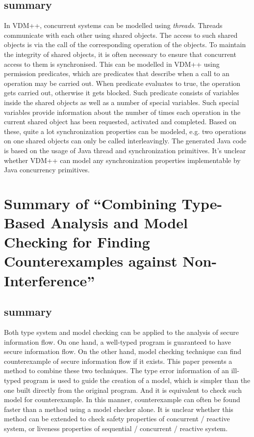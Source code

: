 \documentclass{llncs}
\begin{document}
\subsection{summary}
In VDM++, concurrent systems can be modelled using \emph{threads}. Threads communicate with
each other using shared objects. The access to such shared objects is via 
the call of the corresponding operation of the objects. To maintain the integrity of shared
objects, it is often necessary to ensure that concurrent access to them is synchronised.
This can be modelled in VDM++ using permission predicates, which are predicates that 
describe when a call to an operation may be carried out. When predicate evaluates to true,
the operation gets carried out, otherwise it gets blocked. Such predicate consists of
variables inside the shared objects as well as  a number of special variables. Such special
variables provide information about the number of times each operation in the current
shared object has been requested, activated and completed. Based on these, quite a lot synchronization
properties can be modeled, e.g. two operations on one shared objects can only be called 
interleavingly. The generated Java code is based on the usage of Java thread and synchronization
primitives. It's unclear whether VDM++ can model any synchronization properties implementable by
Java concurrency primitives.
 


\newpage 

\section{Summary of ``Combining Type-Based Analysis and Model Checking for
Finding Counterexamples against Non-Interference''\cite{Unno2006Combining}} 
  \label{section:type_model_interference}

\subsection{summary}
Both type system and model checking can be applied to the analysis of secure information
flow. On one hand, a well-typed program is guaranteed to have secure information flow.
On the other hand, model checking technique can find counterexample of secure information
flow if it exists. This paper presents a method to combine these two techniques. The type
error information of an ill-typed program is used to guide the creation of a model, which
is simpler than the one built directly from the original program. And it is equivalent to
check such model for counterexample. In this manner, counterexample can often be found faster
than a method using a model checker alone. It is unclear whether this method can be extended
to check safety properties of concurrent / reactive system, or liveness properties of
sequential / concurrent / reactive system.
\end{document}
